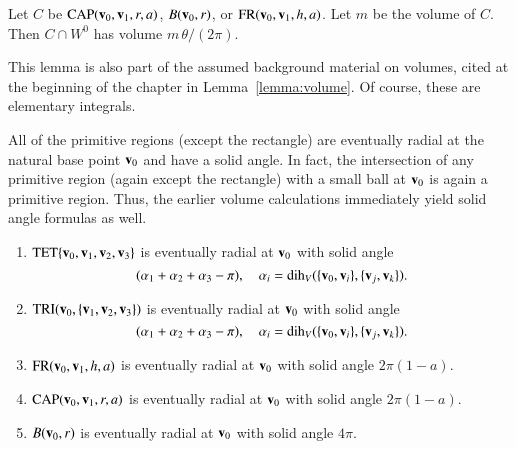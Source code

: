 \begin{lemma}\label{lemma:wedge-vol}  
Let $C$ be ${\operatorname{CAP}}({\mathbf v}_0,{\mathbf v}_1,r,a)$, $B({\mathbf v}_0,r)$,  
or ${\operatorname{FR}}({\mathbf v}_0,{\mathbf v}_1,h,a)$.  Let $m$ be the volume of $C$.  Then
$C\cap W^0$ has volume $m\,\theta/(2\pi)$.
\end{lemma}
%

This lemma is also part of the assumed background material on volumes,
cited at the beginning of the chapter in Lemma~\ref{lemma:volume}.
Of course, these are elementary integrals.


All of the primitive regions (except the rectangle) 
are eventually radial at the natural
base point ${\mathbf v}_0$ and have a
solid angle.  In fact, the intersection of any primitive region (again except
the rectangle) with a small ball at ${\mathbf v}_0$ is again a primitive region.  Thus,
the earlier volume calculations immediately yield solid angle formulas as well.
%

\begin{lemma} \label{lemma:prim-sol}
\begin{enumerate}
\item ${\operatorname{TET}}\{{\mathbf v}_0,{\mathbf v}_1,{\mathbf v}_2,{\mathbf v}_3\}$ is eventually radial at ${\mathbf v}_0$
with solid angle
\[ 
(\alpha_1+\alpha_2+\alpha_3-\pi),\quad
\alpha_i=\operatorname{dih}_V(\{{\mathbf v}_0,{\mathbf v}_i\},\{{\mathbf v}_j,{\mathbf v}_k\}).
\] 
\item  ${\operatorname{TRI}}({\mathbf v}_0,\{{\mathbf v}_1,{\mathbf v}_2,{\mathbf v}_3\})$ is eventually radial at ${\mathbf v}_0$
with solid angle 
\[ 
(\alpha_1+\alpha_2+\alpha_3-\pi),\quad
\alpha_i=\operatorname{dih}_V(\{{\mathbf v}_0,{\mathbf v}_i\},\{{\mathbf v}_j,{\mathbf v}_k\}).
\] 
\item ${\operatorname{FR}}({\mathbf v}_0,{\mathbf v}_1,h,a)$ is eventually radial at ${\mathbf v}_0$ with solid
angle        $2\pi (1-a)$.
\item ${\operatorname{CAP}}({\mathbf v}_0,{\mathbf v}_1,r,a)$ is eventually radial at ${\mathbf v}_0$ with solid
angle 
$2\pi(1-a)$.
\item $B({\mathbf v}_0,r)$ is eventually radial at ${\mathbf v}_0$ with solid
angle 
$4\pi$.
%
\end{enumerate}
\end{lemma}
%
%
%
%


